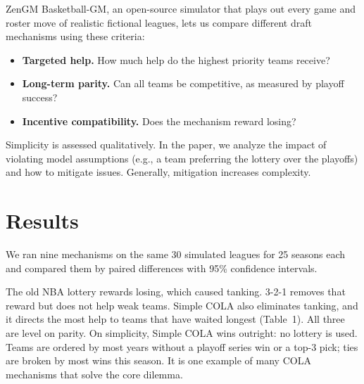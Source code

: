 \documentclass[10pt]{article}
\begin{document}
ZenGM Basketball-GM, an open-source simulator that plays out every game and roster move of realistic fictional leagues, lets us compare different draft mechanisms using these criteria:
\begin{itemize}
\item \textbf{Targeted help.} How much help do the highest priority teams receive?
\item \textbf{Long-term parity.} Can all teams be competitive, as measured by playoff success?
\item \textbf{Incentive compatibility.} Does the mechanism reward losing?
\end{itemize}

Simplicity is assessed qualitatively. In the paper, we analyze the impact of violating model assumptions (e.g., a team preferring the lottery over the playoffs) and how to mitigate issues. Generally, mitigation increases complexity.

\section{Results}

We ran nine mechanisms on the same 30 simulated leagues for 25 seasons each and compared them by paired differences with 95\% confidence intervals.

The old NBA lottery rewards losing, which caused tanking. 3-2-1 removes that reward but does not help weak teams. Simple COLA also eliminates tanking, and it directs the most help to teams that have waited longest (Table~1). All three are level on parity. On simplicity, Simple COLA wins outright: no lottery is used. Teams are ordered by most years without a playoff series win or a top-3 pick; ties are broken by most wins this season. It is one example of many COLA mechanisms that solve the core dilemma.
\end{document}
